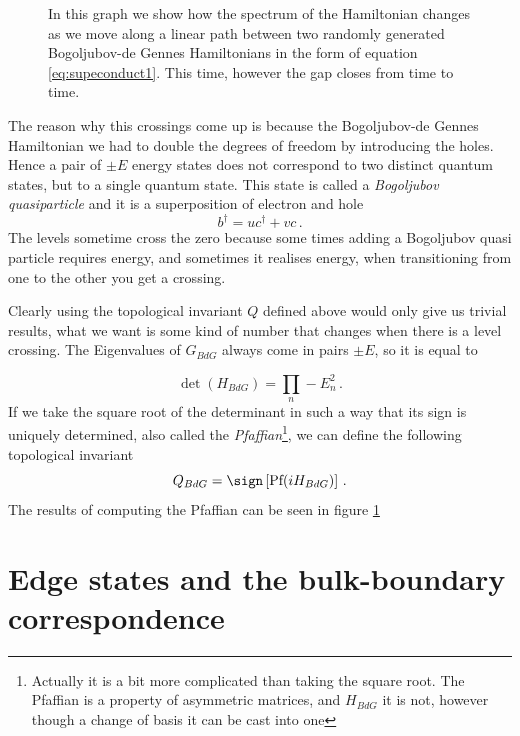     \begin{figure}[h]
        \centering
        
        \caption{
        In this graph we show how the spectrum of the Hamiltonian changes as we move along a linear path between two randomly generated Bogoljubov-de Gennes Hamiltonians in the form of equation \ref{eq:supeconduct1}. This time, however the gap closes from time to time.}
        \label{fig:ham-path-3}
    \end{figure}  

    The reason why this crossings come up is because the Bogoljubov-de Gennes Hamiltonian we had to double the degrees of freedom by introducing the holes. Hence a pair of $\pm E$ energy states does not correspond to two distinct quantum states, but to a single quantum state. This state is called a \textit{Bogoljubov quasiparticle} and it is a superposition of electron and hole
    \begin{equation}
        b^\dag=uc^\dag+vc\,.
    \end{equation}
    The levels sometime cross the zero because some times adding a Bogoljubov quasi particle requires energy, and sometimes it realises energy, when transitioning from one to the other you get a crossing.
    
    Clearly using the topological invariant $Q$ defined above would only give us trivial results, what we want is some kind of number that changes when there is a level crossing. The Eigenvalues of $G_{BdG}$ always come in pairs $\pm E$, so it is equal to 
    
    \[
        \det\left(H_{BdG}\right)=\prod_n -E_n^2\,.
    \]
    If we take the square root of the determinant in such a way that its sign is uniquely determined, also called the \textit{Pfaffian}\footnote{Actually it is a bit more complicated than taking the square root. The Pfaffian is a property of asymmetric matrices, and $H_{BdG}$ it is not, however though a change of basis it can be cast into one}, we can define the following topological invariant 
    \begin{equation}
        Q_{BdG}=\sign\left[\textrm{Pf}(iH_{BdG})\right]\,.
    \end{equation}
    The results of computing the Pfaffian can be seen in figure \ref{fig:ham-path-3}
    

\section{Edge states and the bulk-boundary correspondence}

